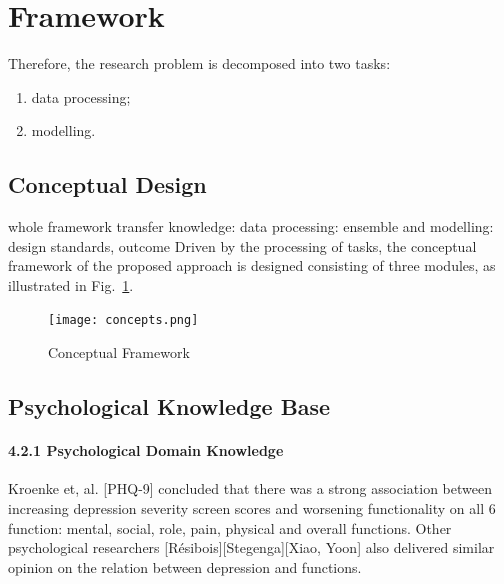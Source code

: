 \documentclass[runningheads]{llncs}
\begin{document}
\paragraph{}
%
%
%
%
%
%
%
%
%
%
%
%
%
%
%
%
%
%
%
%
\pagebreak
\section{Framework}
%
%
Therefore, the research problem is decomposed into two tasks: 
\begin{enumerate}
  \item data processing;
  \item modelling.
\end{enumerate}
%
%
%
%
%
%
%
%
%
%
\subsection{Conceptual Design}
%
%
whole framework
%
transfer knowledge:
data processing:
ensemble and modelling:
%
design standards, outcome
%
%
Driven by the processing of tasks, the conceptual framework of the proposed approach is designed consisting of three modules, as illustrated in Fig.~\ref{fig1}.
\begin{figure}[h]
\texttt{[image: concepts.png]}
\caption{Conceptual Framework} \label{fig1}
\end{figure}
%
%
%
%
%
%
%
%
%
%
%
\subsection{Psychological Knowledge Base}
%
\paragraph{4.2.1 Psychological Domain Knowledge}
Kroenke et, al. [PHQ-9] concluded that there was a strong association between increasing depression severity screen scores and worsening functionality on all 6 function: mental, social, role, pain, physical and overall functions. Other psychological researchers [Résibois][Stegenga][Xiao, Yoon] also delivered similar opinion on the relation between depression and functions. 
%
\end{document}
